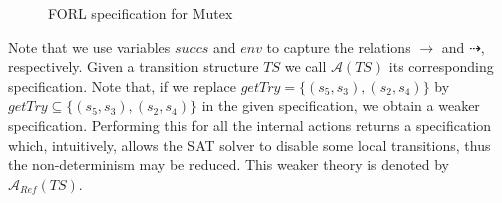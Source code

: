 \begin{figure}[t!]
\caption{\textsf{FORL} specification for Mutex}\label{fig:forl-spec}
\end{figure}
Note that we use variables $\mathit{succs}$ and $\mathit{env}$ to capture the relations $\rightarrow$ and $\dashrightarrow$, respectively. Given a transition structure $\mathit{TS}$ we call $\mathcal{A}(\mathit{TS})$ its corresponding specification. Note that, if we replace $\mathit{getTry} = \{ (s_5,s_3), (s_2,s_4)\}$ by $\mathit{getTry} \subseteq \{ (s_5,s_3), (s_2,s_4)\}$  in the given specification, we obtain a weaker specification. Performing this for all the internal actions returns a specification which, intuitively, 
allows the SAT solver to disable some local transitions, thus the non-determinism may be reduced. This weaker theory is denoted by $\mathcal{A}_{Ref}(TS)$.

